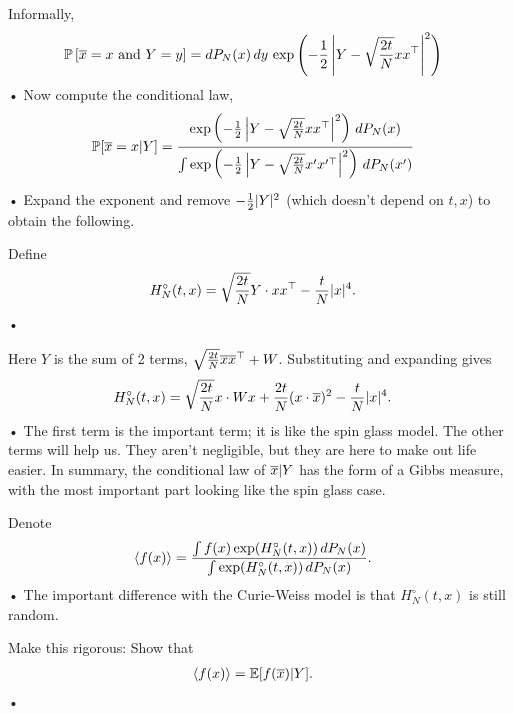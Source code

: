 Informally, 
\begin{align*}
\mathbb{P}\left[ {\overline{x}=x \text{ and }Y=y} \right]
&= dP_N(x)\,dy\, \exp\left( {-\frac{1}{2} \left| {Y-\sqrt{\frac{2t}{N}} x x^\top } \right|^2} \right)
\end{align*}•
Now compute the conditional law,
\begin{align*}
\mathbb{P}[\overline{x}= x|Y] &= \frac{\exp\left( {-\frac{1}{2} \left| {Y-\sqrt{\frac{2t}{N}}x x^\top } \right|^2} \right)\,dP_N(x)}{\int \exp\left( {-\frac{1}{2} \left| {Y-\sqrt{\frac{2t}{N}}x' x^{\prime\top} } \right|^2} \right)\,dP_N(x')}
\end{align*}•
Expand the exponent and remove $-\frac{1}{2}|Y|^2$ (which doesn't depend on $t,x$) to obtain the following.
\begin{df}
Define
\begin{align*}
H_N^\circ (t,x) &= \sqrt{\frac{2t}{N}} Y \cdot xx^\top - \frac{t}{N} |x|^4.
\end{align*}•
\end{df}
Here $Y$ is the sum of 2 terms, $\sqrt{\frac{2t}{N}} \overline{x} \overline{x}^\top +W$. Substituting and expanding gives
\begin{align*}
H_N^\circ (t,x) &= \sqrt{\frac{2t}{N}} x\cdot Wx + \frac{2t}{N}(x\cdot \overline{x})^2 - \frac{t}{N} |x|^4.
\end{align*}•
The first term is the important term; it is like the spin glass model. 
The other terms will help us. They aren't negligible, but they are here to make out life easier. 
In summary, the conditional law of $\overline{x}|Y$ has the form of a Gibbs measure, with the most important part looking like the spin glass case.

Denote 
\begin{align*}
\left\langle {f(x)}\right\rangle &= \frac{\int f(x) \exp(H_N^\circ (t,x))\,dP_N(x)}{\int \exp(H_N^\circ (t,x))\,dP_N(x)}.
\end{align*}•
The important difference with the Curie-Weiss model is that $H_N^\circ (t,x)$ is still random. 

\begin{exr}
Make this rigorous: Show that
\begin{align*}
\left\langle {f(x)}\right\rangle &= \mathbb{E}[f(\overline{x})|Y].
\end{align*}•
\end{exr}

